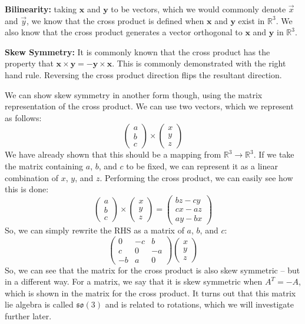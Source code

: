 \textbf{Bilinearity:} taking $\bm{x}$ and $\bm{y}$ to be vectors, which we would commonly denote $\vec{x}$ and $\vec{y}$, we know that the cross product is defined when $\bm{x}$ and $\bm{y}$ exist in $\mathbb{R}^3$. We also know that the cross product generates a vector orthogonal to $\bm{x}$ and $\bm{y}$ in $\mathbb{R}^3$.

\textbf{Skew Symmetry:} It is commonly known that the cross product has the property that $\bm{x}\times \bm{y}=-\bm{y}\times \bm{x}$. This is commonly demonstrated with the right hand rule. Reversing the cross product direction flips the resultant direction.

We can show skew symmetry in another form though, using the matrix representation of the cross product. We can use two vectors, which we represent as follows:
$$\begin{pmatrix}
    a\\b\\c
\end{pmatrix} \times \begin{pmatrix}
    x\\y\\z
\end{pmatrix}$$
We have already shown that this should be a mapping from $\mathbb{R}^3\rightarrow\mathbb{R}^3$. If we take the matrix containing $a$, $b$, and $c$ to be fixed, we can represent it as a linear combination of $x$, $y$, and $z$. Performing the cross product, we can easily see how this is done:
$$\begin{pmatrix}
    a\\b\\c
\end{pmatrix} \times \begin{pmatrix}
    x\\y\\z
\end{pmatrix}=\begin{pmatrix}
    bz-cy\\cx-az\\ay-bx
\end{pmatrix}$$
So, we can simply rewrite the RHS as a matrix of $a$, $b$, and $c$:
$$\begin{pmatrix}
    0&-c&b\\c&0&-a\\-b&a&0
\end{pmatrix}\begin{pmatrix}
    x\\y\\z
\end{pmatrix}$$
So, we can see that the matrix for the cross product is also skew symmetric -- but in a different way. For a matrix, we say that it is skew symmetric when $A^T =-A$, which is shown in the matrix for the cross product. It turns out that this matrix \gls{lie algebra} is called $\mathfrak{so}(3)$ and is related to rotations, which we will investigate further later.

